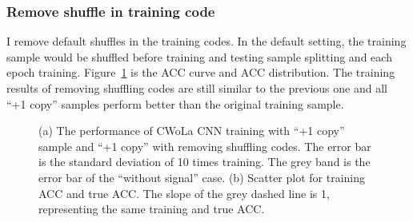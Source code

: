 \documentclass[12pt]{article}
\begin{document}
		\subsubsection{Remove shuffle in training code}%
		\label{subs:remove_shuffle_in_training_code}
			I remove default shuffles in the training codes. In the default setting, the training sample would be shuffled before training and testing sample splitting and each epoch training. Figure~\ref{fig:cwola_cnn_training_performance_copy_1_wo_shuffle_code} is the ACC curve and ACC distribution. The training results of removing shuffling codes are still similar to the previous one and all ``+1 copy'' samples perform better than the original training sample.
			\begin{figure}[htpb]
				\centering
				\caption{(a) The performance of CWoLa CNN training with ``+1 copy'' sample and ``+1 copy'' with removing shuffling codes. The error bar is the standard deviation of 10 times training. The grey band is the error bar of the ``without signal'' case. (b) Scatter plot for training ACC and true ACC. The slope of the grey dashed line is 1, representing the same training and true ACC.}
				\label{fig:cwola_cnn_training_performance_copy_1_wo_shuffle_code}
			\end{figure}
\end{document}
